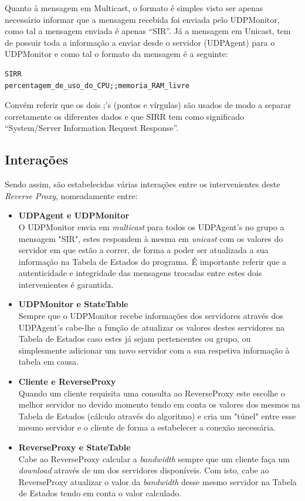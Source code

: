 \documentclass{article}
\begin{document}
Quanto à mensagem em Multicast, o formato é simples visto ser apenas necessário informar que a mensagem recebida foi enviada pelo UDPMonitor, como tal a mensagem enviada é apenas ``SIR''.
Já a mensagem em Unicast, tem de possuir toda a informação a enviar desde o servidor (UDPAgent) para o UDPMonitor e como tal o formato da mensagem é a seguinte:
\begin{verbatim}
SIRR
percentagem_de_uso_do_CPU;;memoria_RAM_livre
\end{verbatim}
Convém referir que os dois ;'s (pontos e vírgulas) são usados de modo a separar corretamente os diferentes dados e que SIRR tem como significado ``System/Server Information Request Response''. 

\subsection{Interações}
{\color{red}
Sendo assim, são estabelecidas várias interações entre os intervenientes deste \textit{Reverse Proxy}, nomeadamente entre:
\begin{itemize}
\item \textbf{UDPAgent e UDPMonitor}\\
O UDPMonitor envia em \textit{multicast} para todos os UDPAgent's no grupo a mensagem "SIR", estes respondem à mesma em \textit{unicast} com os valores do servidor em que estão a correr, de forma a poder ser atualizada a sua informação na Tabela de Estados do programa. É importante referir que a autenticidade e integridade das mensagens trocadas entre estes dois intervenientes é garantida.
\item \textbf{UDPMonitor e StateTable}\\
Sempre que o UDPMonitor recebe informações dos servidores através dos UDPAgent's cabe-lhe a função de atualizar os valores destes servidores na Tabela de Estados caso estes já sejam pertencentes ou grupo, ou simplesmente adicionar um novo servidor com a sua respetiva informação 
à tabela em causa.
\item \textbf{Cliente e ReverseProxy}\\
Quando um cliente requisita uma consulta ao ReverseProxy este escolhe o melhor servidor no devido momento tendo em conta os valores dos mesmos na Tabela de Estados (cálculo através do algoritmo) e cria um "túnel" entre esse mesmo servidor e o cliente de forma a estabelecer a conexão necessária.
\item \textbf{ReverseProxy e StateTable}\\
Cabe ao ReverseProxy calcular a \textit{bandwidth} sempre que um cliente faça um \textit{download} através de um dos servidores disponíveis. Com isto, cabe ao ReverseProxy atualizar o valor da \textit{bandwidth} desse mesmo servidor na Tabela de Estados tendo em conta o valor calculado.
\end{itemize}
}
\end{document}
